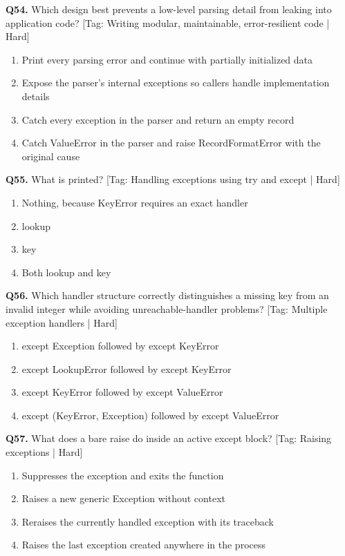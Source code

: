 \vspace{2mm}
\noindent\textbf{Q54.} Which design best prevents a low-level parsing detail from leaking into application code? \hfill [Tag: Writing modular, maintainable, error-resilient code | Hard]
\begin{enumerate}[label=(\alph*),topsep=2pt,itemsep=1pt,partopsep=0pt,parsep=0pt]
    \item {Print every parsing error and continue with partially initialized data}
    \item {Expose the parser's internal exceptions so callers handle implementation details}
    \item {Catch every exception in the parser and return an empty record}
    \item {Catch ValueError in the parser and raise RecordFormatError with the original cause}
\end{enumerate}
\vspace{2mm}
\noindent\textbf{Q55.} What is printed? \hfill [Tag: Handling exceptions using try and except | Hard]
\begin{enumerate}[label=(\alph*),topsep=2pt,itemsep=1pt,partopsep=0pt,parsep=0pt]
    \item {Nothing, because KeyError requires an exact handler}
    \item {lookup}
    \item {key}
    \item {Both lookup and key}
\end{enumerate}
\vspace{2mm}
\noindent\textbf{Q56.} Which handler structure correctly distinguishes a missing key from an invalid integer while avoiding unreachable-handler problems? \hfill [Tag: Multiple exception handlers | Hard]
\begin{enumerate}[label=(\alph*),topsep=2pt,itemsep=1pt,partopsep=0pt,parsep=0pt]
    \item {except Exception followed by except KeyError}
    \item {except LookupError followed by except KeyError}
    \item {except KeyError followed by except ValueError}
    \item {except (KeyError, Exception) followed by except ValueError}
\end{enumerate}
\vspace{2mm}
\noindent\textbf{Q57.} What does a bare raise do inside an active except block? \hfill [Tag: Raising exceptions | Hard]
\begin{enumerate}[label=(\alph*),topsep=2pt,itemsep=1pt,partopsep=0pt,parsep=0pt]
    \item {Suppresses the exception and exits the function}
    \item {Raises a new generic Exception without context}
    \item {Reraises the currently handled exception with its traceback}
    \item {Raises the last exception created anywhere in the process}
\end{enumerate}
